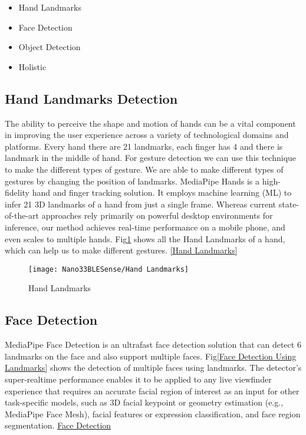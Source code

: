 \begin{itemize}
	\item Hand Landmarks
	\item Face Detection
	\item Object Detection
	\item Holistic
\end{itemize}

\subsection{Hand Landmarks Detection}

The ability to perceive the shape and motion of hands can be a vital component in improving the user experience across a variety of technological domains and platforms. Every hand there are 21 landmarks, each finger has 4 and there is landmark in the middle of hand. For gesture detection we can use this technique to make the different types of gesture. We are able to make different types of gestures by changing the position of landmarks. MediaPipe Hands is a high-fidelity hand and finger tracking solution. It employs machine learning (ML) to infer 21 3D landmarks of a hand from just a single frame. Whereas current state-of-the-art approaches rely primarily on powerful desktop environments for inference, our method achieves real-time performance on a mobile phone, and even scales to multiple hands. Fig\ref{Hand Landmarks} shows all the Hand Landmarks of a hand, which can help us to make different gestures. \href{https://google.github.io/mediapipe/solutions/hands.html}{[Hand Landmarks]}

\begin{figure}[h]
	\centering
	\texttt{[image: Nano33BLESense/Hand Landmarks]}
	\caption{Hand Landmarks}
	\label{Hand Landmarks}
\end{figure} 

\subsection{Face Detection}
MediaPipe Face Detection is an ultrafast face detection solution that can detect 6 landmarks on the face and also support multiple faces. Fig\ref{Face Detection Using Landmarks} shows the detection of multiple faces using landmarks. The detector’s super-realtime performance enables it to be applied to any live viewfinder experience that requires an accurate facial region of interest as an input for other task-specific models, such as 3D facial keypoint or geometry estimation (e.g., MediaPipe Face Mesh), facial features or expression classification, and face region segmentation. \href{https://google.github.io/mediapipe/solutions/face_detection.html}{Face Detection}


